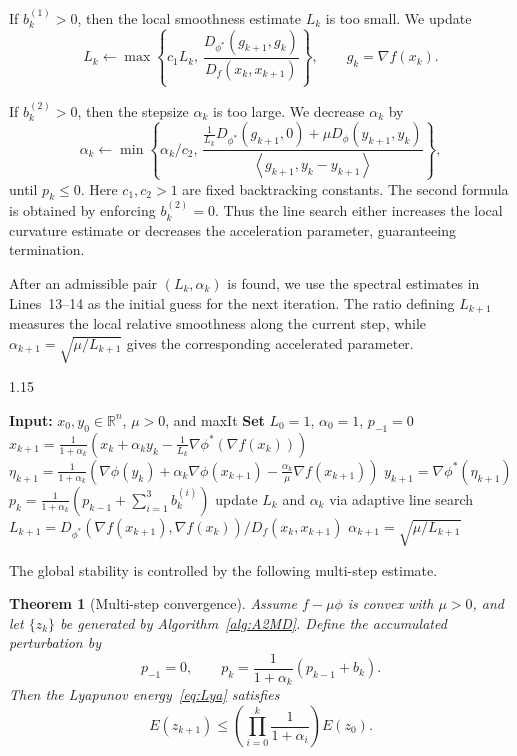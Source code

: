 \documentclass{article}
\newcommand{\dual}[1]{\left\langle {#1} \right\rangle}
\theoremstyle{plain}
\newtheorem{theorem}{Theorem}[section]
\theoremstyle{definition}
\theoremstyle{remark}
\begin{document}
If $b_k^{(1)}>0$, then the local smoothness estimate $L_k$ is too small. We update
$$
L_k
\gets
\max\left\{
c_1L_k,\,
\frac{D_{\phi^*}(g_{k+1},g_k)}{D_f(x_k,x_{k+1})}
\right\},
\qquad
g_k=\nabla f(x_k).
$$

If $b_k^{(2)}>0$, then the stepsize $\alpha_k$ is too large. We decrease $\alpha_k$ by
$$
\alpha_k
\gets
\min\left\{
\alpha_k/c_2,\,
\frac{
\frac{1}{L_k}D_{\phi^*}(g_{k+1},0)
+\mu D_\phi(y_{k+1},y_k)
}{
\dual{g_{k+1},y_k-y_{k+1}}
}
\right\},
$$
until $p_k\le 0$. Here $c_1,c_2>1$ are fixed backtracking constants. The second formula is obtained by enforcing $b_k^{(2)}=0$. Thus the line search either increases the local curvature estimate or decreases the acceleration parameter, guaranteeing termination.

After an admissible pair $(L_k,\alpha_k)$ is found, we use the spectral estimates in Lines~13--14 as the initial guess for the next iteration. The ratio defining $L_{k+1}$ measures the local relative smoothness along the current step, while $\alpha_{k+1}=\sqrt{\mu/L_{k+1}}$ gives the corresponding accelerated parameter.

\begin{algorithm}[t]
\caption{AAMD (Adaptive Accelerated Mirror Descent)}
\label{alg:A2MD}
\begin{spacing}{1.15}
\begin{algorithmic}[1]
\STATE \textbf{Input:} $x_0,y_0\in\mathbb R^n$, $\mu>0$, and maxIt
\STATE \textbf{Set} $L_0=1$, $\alpha_0=1$, $p_{-1}=0$
\REPEAT
\STATE $x_{k+1}=\frac{1}{1+\alpha_k}\left(x_k+\alpha_ky_k-\frac{1}{L_k}\nabla\phi^*(\nabla f(x_k))\right)$
\STATE $\eta_{k+1}=\frac{1}{1+\alpha_k}\left(\nabla\phi(y_k)+\alpha_k\nabla\phi(x_{k+1})-\frac{\alpha_k}{\mu}\nabla f(x_{k+1})\right)$
\STATE $y_{k+1}=\nabla\phi^*(\eta_{k+1})$
\STATE $p_k=\frac{1}{1+\alpha_k}\left(p_{k-1}+\sum_{i=1}^3 b_k^{(i)}\right)$
\STATE update $L_k$ and $\alpha_k$ via adaptive line search
\ENDIF
{}
\STATE $L_{k+1}=D_{\phi^*}(\nabla f(x_{k+1}),\nabla f(x_k))/D_f(x_k,x_{k+1})$
\STATE $\alpha_{k+1}=\sqrt{\mu/L_{k+1}}$
\ENDFOR
\end{algorithmic}
\end{spacing}
\end{algorithm}

The global stability is controlled by the following multi-step estimate.

\begin{theorem}[Multi-step convergence]\label{thm:accumulative}
Assume $f-\mu\phi$ is convex with $\mu>0$, and let $\{z_k\}$ be generated by Algorithm~\ref{alg:A2MD}. Define the accumulated perturbation by
$$
p_{-1}=0,
\qquad
p_k=\frac{1}{1+\alpha_k}(p_{k-1}+b_k).
$$
Then the Lyapunov energy~\eqref{eq:Lya} satisfies
$$
E(z_{k+1})
\le
\left(\prod_{i=0}^k\frac{1}{1+\alpha_i}\right)E(z_0).
$$
\end{theorem}
\end{document}
